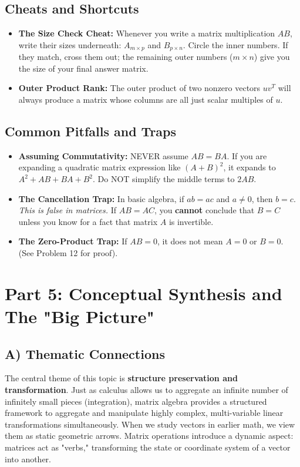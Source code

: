 \documentclass{article}
\begin{document}
\subsection*{Cheats and Shortcuts}
\begin{itemize}
    \item \textbf{The Size Check Cheat:} Whenever you write a matrix multiplication $AB$, write their sizes underneath: $A_{m \times p}$ and $B_{p \times n}$. Circle the inner numbers. If they match, cross them out; the remaining outer numbers ($m \times n$) give you the size of your final answer matrix. 
    \item \textbf{Outer Product Rank:} The outer product of two nonzero vectors $uv^T$ will always produce a matrix whose columns are all just scalar multiples of $u$. 
\end{itemize}

\subsection*{Common Pitfalls and Traps}
\begin{itemize}
    \item \textbf{Assuming Commutativity:} NEVER assume $AB = BA$. If you are expanding a quadratic matrix expression like $(A+B)^2$, it expands to $A^2 + AB + BA + B^2$. Do NOT simplify the middle terms to $2AB$.
    \item \textbf{The Cancellation Trap:} In basic algebra, if $ab = ac$ and $a \neq 0$, then $b = c$. \textit{This is false in matrices.} If $AB = AC$, you \textbf{cannot} conclude that $B = C$ unless you know for a fact that matrix $A$ is invertible. 
    \item \textbf{The Zero-Product Trap:} If $AB = 0$, it does not mean $A = 0$ or $B = 0$. (See Problem 12 for proof).
\end{itemize}

\section*{Part 5: Conceptual Synthesis and The "Big Picture"}

\subsection*{A) Thematic Connections}
The central theme of this topic is \textbf{structure preservation and transformation}. Just as calculus allows us to aggregate an infinite number of infinitely small pieces (integration), matrix algebra provides a structured framework to aggregate and manipulate highly complex, multi-variable linear transformations simultaneously. When we study vectors in earlier math, we view them as static geometric arrows. Matrix operations introduce a dynamic aspect: matrices act as "verbs," transforming the state or coordinate system of a vector into another.
\end{document}
